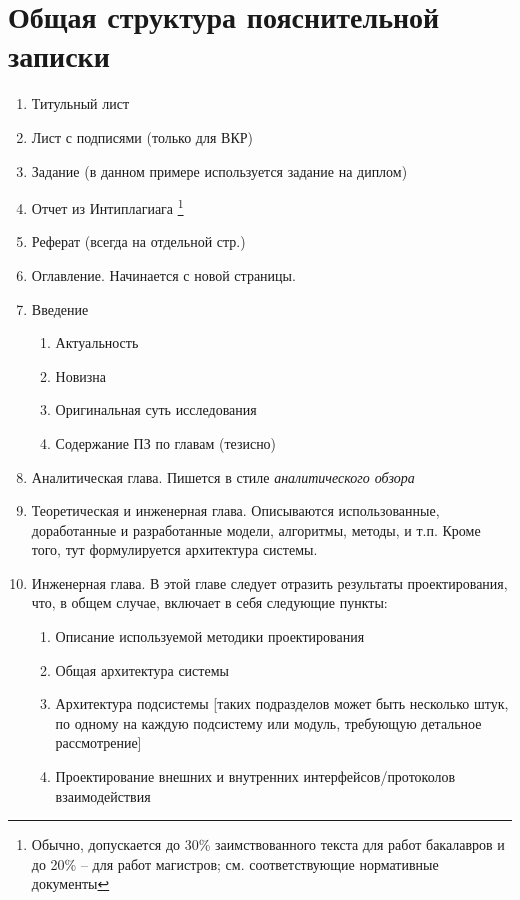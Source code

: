 ﻿\chapter{Общая структура пояснительной записки}\label{app-structure}

\begin{enumerate}
	\item Титульный лист %
	\item Лист с подписями (только для ВКР)
	\item Задание (в данном примере используется задание на диплом)
	\item Отчет из Интиплагиага \footnote{Обычно, допускается до 30\% заимствованного текста для работ бакалавров и до 20\% -- для работ магистров; см. соответствующие нормативные документы}
	\item Реферат (всегда на отдельной стр.)%
	\item Оглавление. Начинается с новой страницы. %
	\item Введение
	\begin{enumerate}
		\item Актуальность
		\item Новизна
		\item Оригинальная суть исследования
		\item Содержание ПЗ по главам (тезисно)
	\end{enumerate}
	\item Аналитическая глава. Пишется в стиле \textit{аналитического обзора}
	\item Теоретическая и инженерная глава. Описываются использованные, доработанные и разработанные модели, алгоритмы, методы, и т.п. Кроме того, тут формулируется архитектура системы.
	\item Инженерная глава. В этой главе следует отразить результаты проектирования, что, в общем случае, включает в себя следующие пункты:
	\begin{enumerate}
		\item Описание используемой методики проектирования
		\item Общая архитектура системы
		\item Архитектура подсистемы [таких подразделов может быть несколько штук, по одному на каждую подсистему или модуль, требующую детальное рассмотрение]
		\item Проектирование внешних и внутренних интерфейсов/протоколов взаимодействия

\end{enumerate}
\end{enumerate}
